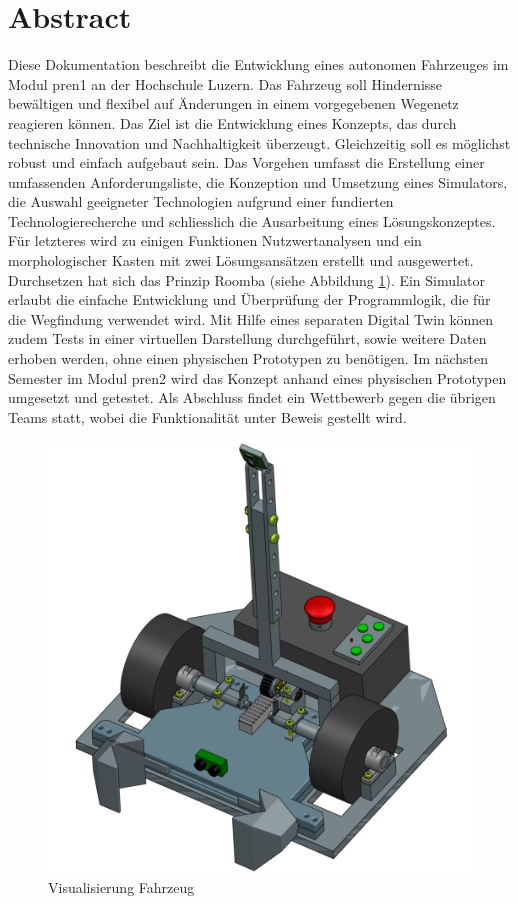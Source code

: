 \newpage
\section{Abstract}

Diese Dokumentation beschreibt die Entwicklung eines autonomen Fahrzeuges im Modul \acrfull{pren1} an der Hochschule Luzern. Das Fahrzeug soll Hindernisse bewältigen und flexibel auf Änderungen in einem vorgegebenen Wegenetz reagieren können. Das Ziel ist die Entwicklung eines Konzepts, das durch technische Innovation und Nachhaltigkeit überzeugt. Gleichzeitig soll es möglichst robust und einfach aufgebaut sein.
Das Vorgehen umfasst die Erstellung einer umfassenden Anforderungsliste, die Konzeption und Umsetzung eines Simulators, die Auswahl geeigneter Technologien aufgrund einer fundierten Technologierecherche und schliesslich die Ausarbeitung eines Lösungskonzeptes. Für letzteres wird zu einigen Funktionen Nutzwertanalysen und ein morphologischer Kasten mit zwei Lösungsansätzen erstellt und ausgewertet. Durchsetzen hat sich das Prinzip Roomba (siehe Abbildung \ref{img:Visualisierung Fahrzeug}). Ein Simulator erlaubt die einfache Entwicklung und Überprüfung der Programmlogik, die für die Wegfindung verwendet wird. Mit Hilfe eines separaten Digital Twin können zudem Tests in einer virtuellen Darstellung durchgeführt, sowie weitere Daten erhoben werden, ohne einen physischen Prototypen zu benötigen. 
Im nächsten Semester im Modul \acrshort{pren2} wird das Konzept anhand eines physischen Prototypen umgesetzt und getestet. Als Abschluss findet ein Wettbewerb gegen die übrigen Teams statt, wobei die Funktionalität unter Beweis gestellt wird.

\begin{figure}[H] %
    \centering
        \includegraphics[width=0.6\linewidth]       {Skizze_Fahrzeug.png}               \caption[Visualisierung Fahrzeug]
        {Visualisierung Fahrzeug}
        
        \label{img:Visualisierung Fahrzeug}
    \end{figure} 